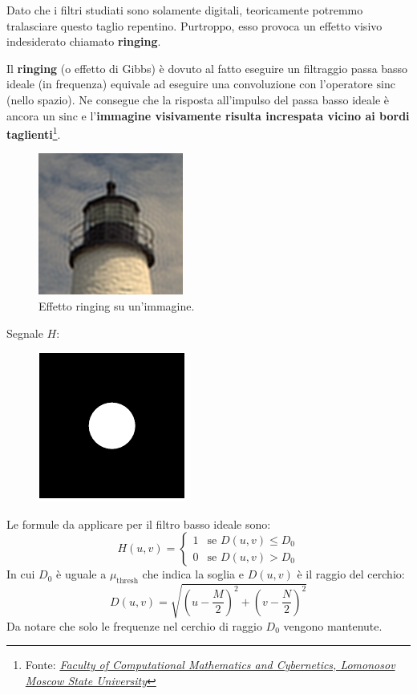 \documentclass[a4paper]{article}
\begin{document}
	\noindent
	Dato che i filtri studiati sono solamente digitali, teoricamente potremmo tralasciare questo taglio repentino. Purtroppo, esso provoca un effetto visivo indesiderato chiamato \textbf{ringing}.\newline
	
	\noindent
	Il \textcolor{Red3}{\textbf{ringing}} (o effetto di Gibbs) è dovuto al fatto eseguire un filtraggio passa basso ideale (in frequenza) equivale ad eseguire una convoluzione con l'operatore $\mathrm{sinc}$ (nello spazio). Ne consegue che la risposta all'impulso del passa basso ideale è ancora un $\mathrm{sinc}$ e l'\textbf{immagine visivamente risulta increspata vicino ai bordi taglienti}\footnote{Fonte: \href{https://imaging.cs.msu.ru/en/research/ringing}{\emph{Faculty of Computational Mathematics and Cybernetics, Lomonosov Moscow State University}}}.
	\begin{figure}[!htp]
		\centering
		\includegraphics[width=.4\textwidth]{img/ringing_example.png}
		\caption{Effetto ringing su un'immagine.}
	\end{figure}\newpage

	\noindent
	Segnale $H$:
	\begin{figure}[!htp]
		\centering
		\includegraphics[width=.3\textwidth]{img/filtro_passa_basso_ideale.pdf}
	\end{figure}

	\noindent
	Le formule da applicare per il filtro basso ideale sono:
	\begin{equation*}
		H\left(u,v\right) = \begin{cases}
			1 & \text{se } D\left(u,v\right) \le D_{0} \\
			0 & \text{se } D\left(u,v\right) > D_{0}
		\end{cases}
	\end{equation*}
	In cui $D_{0}$ è uguale a $\mu_{\text{thresh}}$ che indica la soglia e $D\left(u,v\right)$ è il raggio del cerchio:
	\begin{equation*}
		D\left(u,v\right) = \sqrt{\left(u - \dfrac{M}{2}\right)^{2} + \left(v - \dfrac{N}{2}\right)^{2}}
	\end{equation*}
	Da notare che solo le frequenze nel cerchio di raggio $D_{0}$ vengono mantenute.\newpage
	
\end{document}

